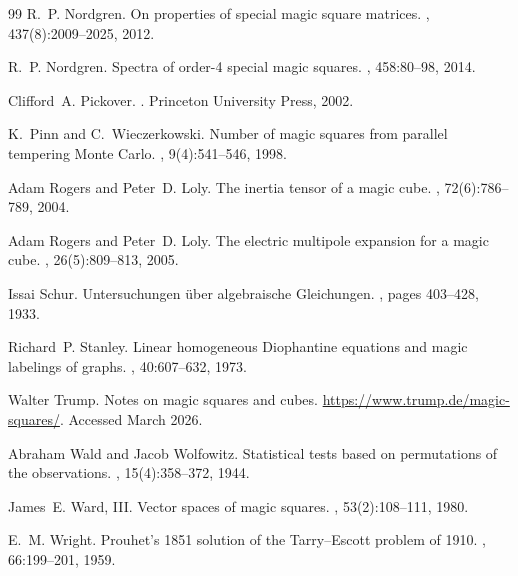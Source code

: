 \documentclass[11pt,a4paper]{article}
\theoremstyle{plain}
\theoremstyle{definition}
\theoremstyle{remark}
\begin{document}
\begin{thebibliography}{99}
R.~P. Nordgren.
\newblock On properties of special magic square matrices.
, 437(8):2009--2025, 2012.

R.~P. Nordgren.
\newblock Spectra of order-4 special magic squares.
, 458:80--98, 2014.

Clifford~A. Pickover.
.
\newblock Princeton University Press, 2002.

K.~Pinn and C.~Wieczerkowski.
\newblock Number of magic squares from parallel tempering {M}onte {C}arlo.
, 9(4):541--546, 1998.

Adam Rogers and Peter~D. Loly.
\newblock The inertia tensor of a magic cube.
, 72(6):786--789, 2004.

Adam Rogers and Peter~D. Loly.
\newblock The electric multipole expansion for a magic cube.
, 26(5):809--813, 2005.

Issai Schur.
\newblock Untersuchungen {\"u}ber algebraische {G}leichungen.
, pages 403--428, 1933.

Richard~P. Stanley.
\newblock Linear homogeneous {D}iophantine equations and magic labelings of
  graphs.
, 40:607--632, 1973.

Walter Trump.
\newblock Notes on magic squares and cubes.
\newblock \url{https://www.trump.de/magic-squares/}.
\newblock Accessed March 2026.

Abraham Wald and Jacob Wolfowitz.
\newblock Statistical tests based on permutations of the observations.
, 15(4):358--372, 1944.

James~E. Ward, III.
\newblock Vector spaces of magic squares.
, 53(2):108--111, 1980.

E.~M. Wright.
\newblock Prouhet's 1851 solution of the {T}arry--{E}scott problem of 1910.
, 66:199--201, 1959.

\end{thebibliography}
\end{document}
